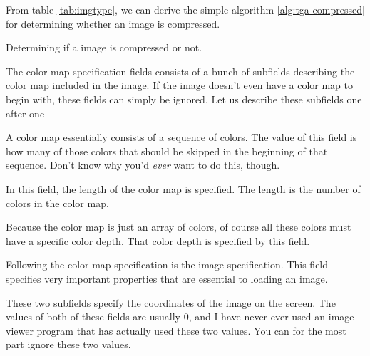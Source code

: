 \begin{refsection}
  From table \ref{tab:imgtype}, we can derive the simple algorithm
  \ref{alg:tga-compressed} for determining whether an image is
  compressed.

  \begin{algorithm}[H]
    \caption{Determining if a \tga image is compressed or not.}
    \label{alg:tga-compressed}
    \begin{algorithmic}[1]
    \end{algorithmic}
  \end{algorithm}


  The color map specification fields consists of a bunch of subfields
  describing the color map included in the image. If the image
  doesn't even have a color map to begin with, these fields can simply
  be ignored. Let us describe these subfields one after one


  A color map essentially consists of a sequence of colors. The value
  of this field is how many of those colors that should be skipped in
  the beginning of that sequence. Don't know why you'd \textit{ever}
  want to do this, though.


  In this field, the length of the color map is specified. The
  length is the number of colors in the color map.


  Because the color map is just an array of colors, of course all
  these colors must have a specific color depth. That color depth is
  specified by this field.


  Following the color map specification is the image
  specification. This field specifies very important properties that
  are essential to loading an image.



  These two subfields specify the coordinates of the image on the
  screen. The values of both of these fields are usually $0$, and I
  have never ever used an image viewer program that has actually used
  these two values. You can for the most part ignore these two values.


\end{refsection}
